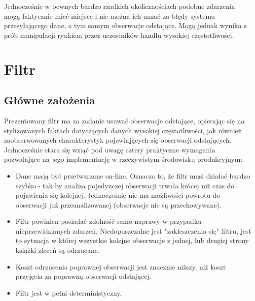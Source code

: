 \documentclass[a4paper,12pt,openany, DIV=calc, headsepline]{scrbook}
\begin{document}
Jednocześnie w pewnych bardzo rzadkich okolicznościach podobne zdarzenia mogą faktycznie mieć miejsce i nie można ich uznać za błędy systemu przesyłającego dane, a tym samym obserwacje odstające. Mogą jednak wynika z prób manipulacji rynkiem przez uczestników handlu wysokiej częstotliwości.

\chapter{Filtr}

\newcommand{\Spt}{\ensuremath{Sp_{t}} }

\newcommand{\MSpc}{\ensuremath{Sp_{t|t-1}} }
\newcommand{\MSpn}{\ensuremath{Sp_{t+1|t}} }
\newcommand{\MSpo}{\ensuremath{Sp_{t-1|t-1}} }

\newcommand{\ts}{\ensuremath{{t}} }
\newcommand{\tsl}{\ensuremath{{t-1}} }



\section{Główne założenia}

Prezentowany filtr ma za zadanie usuwać obserwacje odstające, opierając się na stylizowanych faktach dotyczących danych wysokiej częstotliwości, jak również zaobserwowanych charakterystyk pojawiających się obserwacji odstających. Jednocześnie stara się wziąć pod uwagę cztery praktyczne wymagania pozwalające na jego implementację w rzeczywistym środowisku produkcyjnym:


\begin{itemize}
\item Dane mają być przetwarzane on-line. Oznacza to, że filtr musi działać bardzo szybko - tak by analiza pojedynczej obserwacji trwała krócej niż czas do pojawienia się kolejnej. Jednocześnie nie ma możliwości powrotu do obserwacji już przeanalizowanej (obserwacje nie są przechowywane).
\item Filtr powinien posiadać zdolność samo-naprawy w przypadku nieprzewidzianych zdarzeń. Niedopuszczalne jest "zakleszczenia się" filtru, jest to sytuacja w której wszystkie kolejne obserwacje z jednej, lub drugiej strony książki zleceń są odrzucane.
\item Koszt odrzucenia poprawnej obserwacji jest znacznie niższy, niż koszt przyjęcia za poprawną obserwacji odstającej. 
\item Filtr jest w pełni deterministyczny.
\end{itemize} 
\end{document}
